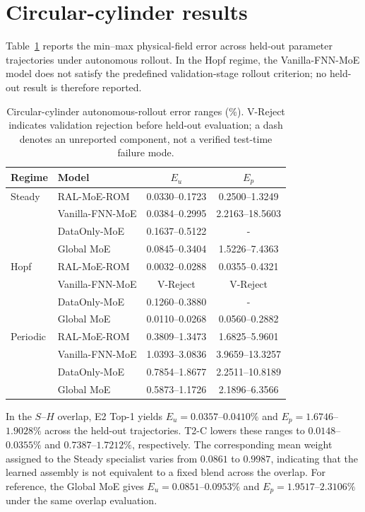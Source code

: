 \section{Circular-cylinder results}
\label{app:circular}

Table~\ref{tab:circular_full} reports the min--max physical-field error across held-out parameter trajectories under autonomous rollout. In the Hopf regime, the Vanilla-FNN-MoE model does not satisfy the predefined validation-stage rollout criterion; no held-out result is therefore reported.

\par
\begin{table}[H]
\centering
\caption{Circular-cylinder autonomous-rollout error ranges (\%). V-Reject indicates validation rejection before held-out evaluation; a dash denotes an unreported component, not a verified test-time failure mode.}
\label{tab:circular_full}
\small
\setlength{\tabcolsep}{4pt}
\begin{tabular}{llcc}
\toprule
Regime & Model & $E_u$ & $E_p$ \\
\midrule
Steady & RAL-MoE-ROM & 0.0330--0.1723 & 0.2500--1.3249 \\
 & Vanilla-FNN-MoE & 0.0384--0.2995 & 2.2163--18.5603 \\
 & DataOnly-MoE & 0.1637--0.5122 & - \\
 & Global MoE & 0.0845--0.3404 & 1.5226--7.4363 \\
\midrule
Hopf & RAL-MoE-ROM & 0.0032--0.0288 & 0.0355--0.4321 \\
 & Vanilla-FNN-MoE & V-Reject & V-Reject  \\
 & DataOnly-MoE & 0.1260--0.3880 & - \\
 & Global MoE & 0.0110--0.0268 & 0.0560--0.2882 \\
\midrule
Periodic & RAL-MoE-ROM & 0.3809--1.3473 & 1.6825--5.9601 \\
 & Vanilla-FNN-MoE & 1.0393--3.0836 & 3.9659--13.3257 \\
 & DataOnly-MoE & 0.7854--1.8677 & 2.2511--10.8189 \\
 & Global MoE & 0.5873--1.1726 & 2.1896--6.3566 \\
\bottomrule
\end{tabular}
\end{table}
\par

In the $S$--$H$ overlap, E2 Top-1 yields $E_u=0.0357$--$0.0410\%$ and
$E_p=1.6746$--$1.9028\%$ across the held-out trajectories. T2-C lowers these ranges to $0.0148$--$0.0355\%$ and $0.7387$--$1.7212\%$, respectively. The corresponding mean weight assigned to the Steady specialist varies from $0.0861$ to $0.9987$, indicating that the learned assembly is not equivalent to a fixed blend across the overlap. For reference, the Global MoE gives $E_u=0.0851$--$0.0953\%$ and $E_p=1.9517$--$2.3106\%$ under the same overlap evaluation.
